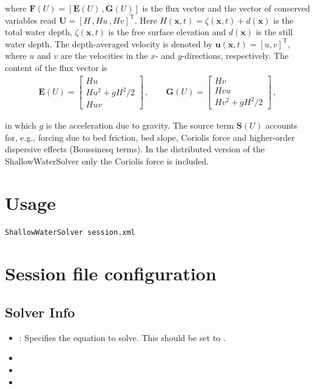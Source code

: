 where $\mathbf F(U) = \left[{\mathbf E(U)}\,, {\mathbf G(U)} \right]$ is the
flux vector and the vector of conserved variables read
${\mathbf U}=\left[H\,,Hu\,,Hv \right]^{\mathrm{T}}$. Here 
$H({\mathbf x},t)=\zeta({\mathbf x},t) + d({\mathbf x})$ is the total
water depth, $\zeta({\mathbf x},t)$ is the free surface elevation and
$d({\mathbf x})$ is the still water depth. The depth-averaged velocity
is denoted by ${\mathbf u}({\mathbf x},t) = \left[u,v\right]^{\mathrm{T}}$,
where $u$ and $v$ are the velocities in the $x$- and
$y$-directions, respectively. The content of the flux vector is
\begin{align*}
{\mathbf E(U)} = \left[ \begin{array}{c} Hu\\Hu^2 +
gH^2/2\\Huv\end{array}\right]\,, \qquad {\mathbf G(U)} = \left[
\begin{array}{c} Hv\\Hvu\\Hv^2 + gH^2/2\end{array}\right]\,,
\end{align*}

in which $g$ is the acceleration due to gravity. The source term
${\mathbf S(U)}$ accounts for, e.g., forcing due to bed
friction, bed slope, Coriolis force and higher-order dispersive effects 
(Boussinesq terms). In the distributed version of the ShallowWaterSolver
only the Coriolis force is included. 

\section{Usage}
\begin{lstlisting}[style=BashInputStyle]
ShallowWaterSolver session.xml
\end{lstlisting}

\section{Session file configuration}

\subsection{Solver Info}
\begin{itemize}
\item {}: Specifies the equation to solve. This should be set
to .
\item {}
\item {}
\item {}
\end{itemize}

